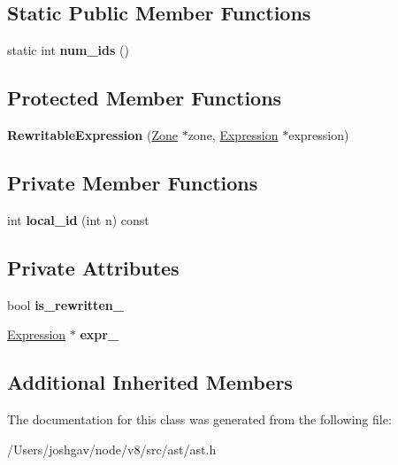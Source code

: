 \subsection*{Static Public Member Functions}
\begin{DoxyCompactItemize}
\item 
static int {\bfseries num\+\_\+ids} ()\hypertarget{classv8_1_1internal_1_1_rewritable_expression_aca4c3679041d58021c38da0b73d9c96b}{}\label{classv8_1_1internal_1_1_rewritable_expression_aca4c3679041d58021c38da0b73d9c96b}

\end{DoxyCompactItemize}
\subsection*{Protected Member Functions}
\begin{DoxyCompactItemize}
\item 
{\bfseries Rewritable\+Expression} (\hyperlink{classv8_1_1internal_1_1_zone}{Zone} $\ast$zone, \hyperlink{classv8_1_1internal_1_1_expression}{Expression} $\ast$expression)\hypertarget{classv8_1_1internal_1_1_rewritable_expression_a6948046d3eca74502af4994809647391}{}\label{classv8_1_1internal_1_1_rewritable_expression_a6948046d3eca74502af4994809647391}

\end{DoxyCompactItemize}
\subsection*{Private Member Functions}
\begin{DoxyCompactItemize}
\item 
int {\bfseries local\+\_\+id} (int n) const \hypertarget{classv8_1_1internal_1_1_rewritable_expression_aa9d0917be956e7086c009d35c1857357}{}\label{classv8_1_1internal_1_1_rewritable_expression_aa9d0917be956e7086c009d35c1857357}

\end{DoxyCompactItemize}
\subsection*{Private Attributes}
\begin{DoxyCompactItemize}
\item 
bool {\bfseries is\+\_\+rewritten\+\_\+}\hypertarget{classv8_1_1internal_1_1_rewritable_expression_ab94873ddf71b35fac8bc8f692ad8155b}{}\label{classv8_1_1internal_1_1_rewritable_expression_ab94873ddf71b35fac8bc8f692ad8155b}

\item 
\hyperlink{classv8_1_1internal_1_1_expression}{Expression} $\ast$ {\bfseries expr\+\_\+}\hypertarget{classv8_1_1internal_1_1_rewritable_expression_a88ff6c6975549f12cc5e0042e349d46d}{}\label{classv8_1_1internal_1_1_rewritable_expression_a88ff6c6975549f12cc5e0042e349d46d}

\end{DoxyCompactItemize}
\subsection*{Additional Inherited Members}


The documentation for this class was generated from the following file\+:\begin{DoxyCompactItemize}
\item 
/\+Users/joshgav/node/v8/src/ast/ast.\+h\end{DoxyCompactItemize}
